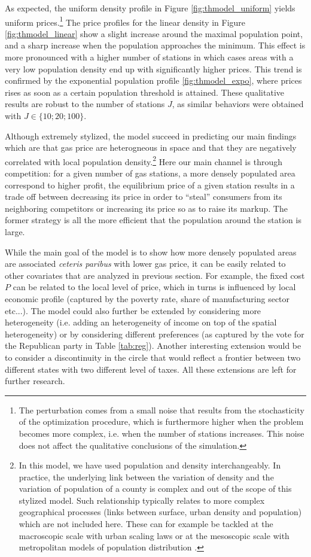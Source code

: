 \documentclass[10pt]{article}
\begin{document}
As expected, the uniform density profile in Figure \ref{fig:thmodel_uniform} yields uniform prices.\footnote{The perturbation comes from a small noise that results from the stochasticity of the optimization procedure, which is furthermore higher when the problem becomes more complex, i.e. when the number of stations increases. This noise does not affect the qualitative conclusions of the simulation.} The price profiles for the linear density in Figure \ref{fig:thmodel_linear} show a slight increase around the maximal population point, and a sharp increase when the population approaches the minimum. This effect is more pronounced with a higher number of stations in which cases areas with a very low population density end up with significantly higher prices. This trend is confirmed by the exponential population profile \ref{fig:thmodel_expo}, where prices rises as soon as a certain population threshold is attained. These qualitative results are robust to the number of stations $J$, as similar behaviors were obtained with $J\in \{10;20;100\}$.

Although extremely stylized, the model succeed in predicting our main findings which are that gas price are heterogneous in space and that they are negatively correlated with local population density.\footnote{In this model, we have used population and density interchangeably. In practice, the underlying link between the variation of density and the variation of population of a county is complex and out of the scope of this stylized model. Such relationship typically relates to more complex geographical processes (links between surface, urban density and population) which are not included here. These can for example be tackled at the macroscopic scale with urban scaling laws \citep{marshall2007urban} or at the mesoscopic scale with metropolitan models of population distribution \citep{anas1998urban}.} Here our main channel is through competition: for a given number of gas stations, a more densely populated area correspond to higher profit, the equilibrium price of a given station results in a trade off between decreasing its price in order to ``steal'' consumers from its neighboring competitors or increasing its price so as to raise its markup. The former strategy is all the more efficient that the population around the station is large.

While the main goal of the model is to show how more densely populated areas are associated \emph{ceteris paribus} with lower gas price, it can be easily related to other covariates that are analyzed in previous section. For example, the fixed cost $P$ can be related to the local level of price, which in turns is influenced by local economic profile (captured by the poverty rate, share of manufacturing sector etc...). The model could also further be extended by considering more heterogeneity (i.e. adding an heterogeneity of income on top of the spatial heterogeneity) or by considering different preferences (as captured by the vote for the Republican party in Table \ref{tab:reg}). Another interesting extension would be to consider a discontinuity in the circle that would reflect a frontier between two different states with two different level of taxes. All these extensions are left for further research.
\end{document}
